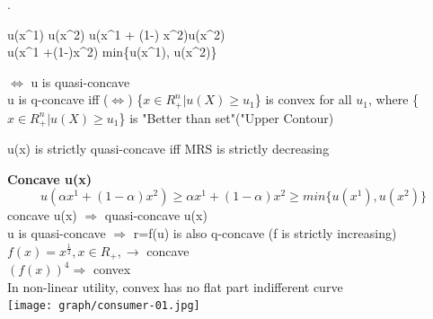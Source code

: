 \documentclass[letterpaper,13pt,single,pdftex]{scrartcl}
\newenvironment{rcases}
  {\left.\begin{aligned}}
  {\end{aligned}\right\rbrace}
\begin{document}
\begin{rcases}
    u(x^1) \ge u(x^2) \Rightarrow u(\alpha x^1 + (1-\alpha) x^2)\ge u(x^2)\\  \Leftrightarrow u(\alpha x^1 +(1-\alpha)x^2) \ge min\{u(x^1), u(x^2)\}
\end{rcases}

 $\Leftrightarrow$ u is quasi-concave\\
 
u is q-concave iff ($\iff$) \{$x\in R^n_+| u(X) \ge u_1$\} is convex for all $u_1$, where \{$x\in R^n_+| u(X) \ge u_1$\} is "Better than set"("Upper Contour)


 u(x) is strictly quasi-concave iff MRS is strictly decreasing

\par \textbf{Concave u(x)}
 \[ u(\alpha x^1 +(1-\alpha)x^2 ) \ge \alpha x^1 + (1-\alpha) x^2  {\ge min\{u(x^1), u(x^2)\} } \]
concave u(x) $\Rightarrow$ quasi-concave u(x)\\
u is quasi-concave $\Rightarrow$ r=f(u) is also q-concave (f is strictly increasing)\\
$f(x) = x^{\frac{1}{2}}, x\in R_+, \rightarrow $ concave\\
$(f(x))^4 \Rightarrow$ convex\\
In non-linear utility, convex has no flat part indifferent curve\\
\texttt{[image: graph/consumer-01.jpg]}
\end{document}
